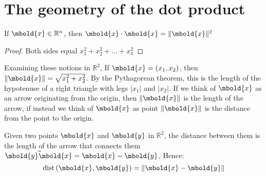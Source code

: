 \documentclass[12pt letter]{report}
\begin{document}

\section{The geometry of the dot product}


\begin{prop}[]
  If $\mbold{x} \in \mathbb{R}^{n}$, then $\mbold{x} \cdot \mbold{x} = \|\mbold{x}\|^2$
  \begin{proof}
    Both sides equal $x_1^2 + x_2^2 + \ldots + x_n^2$
  \end{proof}

\end{prop}

Examining these notions in $\mathbb{R}^2$, If $\mbold{x} = \left( x_1, x_2 \right) $, then $\|\mbold{x}\| = \sqrt{x_1^2
    + x_2^2} $. By the Pythagorean theorem, this is the length of the hypotenuse of a right triangle with legs $\left| x_1
  \right|$ and $\left| x_2 \right|$. If we think of $\mbold{x}$ as an arrow originating from the origin, then
$\|\mbold{x}\|$ is the length of the arrow, if instead we think of $\mbold{x}$ as point $\|\mbold{x}\|$ is the
distance from the point to the origin.

Given two points $\mbold{x}$ and $\mbold{y}$ in $\mathbb{R}^{2}$, the distance between them is the length of the arrow
that connects them $\vec{\mbold{y}\mbold{x}} = \mbold{x} - \mbold{y}$, Hence:
\[
  \text{dist} \left( \mbold{x}, \mbold{y} \right)  = \|\mbold{x} - \mbold{y}\|
\]
\end{document}

